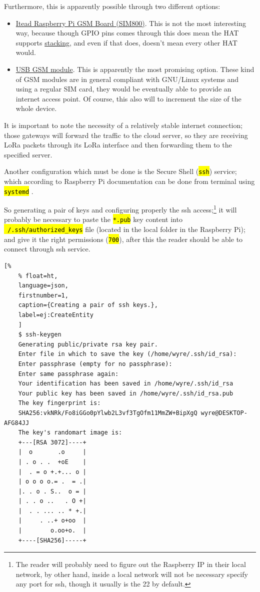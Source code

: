 \documentclass[11pt,a4paper,dvipsnames,twoside]{article}
\newcommand{\cmd}[1] {\hl{\texttt{#1}}}
\begin{document}
\begin{itemize}
  Furthermore, this is apparently possible through two different options:
    \begin{itemize}
      \item \href{https://www.itead.cc/wiki/RPI_SIM800_GSM/GPRS_ADD-ON_V2.0}{Itead Raspberry Pi GSM Board (SIM800)}. This is not the most interesting way, because though GPIO pins comes through this does mean the HAT supports \href{http://www.pi-in-the-sky.com/index.php?id=stacking-guide}{stacking}, and even if that does, doesn't mean every other HAT would.
      \item \href{https://tutorials-raspberrypi.com/raspberry-pi-gsm-module-mobile-internet-lte-3g-umts/}{USB GSM module}. This is apparently the most promising option. These kind of GSM modules are in general compliant with GNU/Linux systems and using a regular SIM card, they would be eventually able to provide an internet access point. Of course, this also will to increment the size of the whole device.
    \end{itemize}
\end{itemize}

It is important to note the necessity of a relatively stable internet connection; those gateways will forward the traffic to the cloud server, so they are receiving LoRa packets through its LoRa interface and then forwarding them to the specified server. 

Another configuration which must be done is the Secure Shell (\cmd{ssh}) service; which according to Raspberry Pi documentation can be done from terminal using \cmd{systemd} \cite{RaspiSSH}. 

So generating a pair of keys and configuring properly the ssh access;\footnote{The reader will probably need to figure out the Raspberry IP in their local network, by other hand, inside a local network will not be necessary specify any port for ssh, though it usually is the 22 by default.} it will probably be necessary to paste the \cmd{*.pub} key content into \cmd{~/.ssh/authorized\_keys} file (located in the local folder in the Raspberry Pi); and give it the right permissions (\cmd{700}), after this the reader should be able to connect through ssh service.

\begin{lstlisting}[%
    % float=ht,
    language=json,
    firstnumber=1,
    caption={Creating a pair of ssh keys.},
    label=ej:CreateEntity
    ]
    $ ssh-keygen
    Generating public/private rsa key pair.
    Enter file in which to save the key (/home/wyre/.ssh/id_rsa): 
    Enter passphrase (empty for no passphrase): 
    Enter same passphrase again: 
    Your identification has been saved in /home/wyre/.ssh/id_rsa
    Your public key has been saved in /home/wyre/.ssh/id_rsa.pub
    The key fingerprint is:
    SHA256:vkNRk/Fo8iGGo0pYlwb2L3vf3TgOfm11MmZW+BipXgQ wyre@DESKTOP-AFG84JJ
    The key's randomart image is:
    +---[RSA 3072]----+
    |  o       .o     |
    | . o . .  +oE    |
    |  . = o +.+... o |
    | o o o o.= .  = .|
    |. . o . S..  o = |
    | . . o ..   . O +|
    |  . . ... .. * +.|
    |     . ..+ o+oo  |
    |        o.oo+o.  |
    +----[SHA256]-----+
\end{lstlisting}
\end{document}
